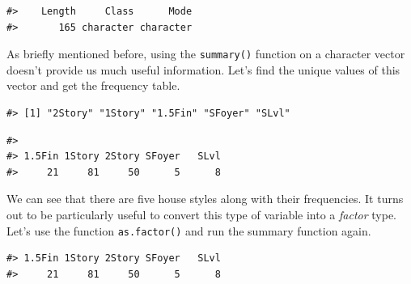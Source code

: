 \documentclass[
]{book}
\newenvironment{Shaded}{\begin{snugshade}}{\end{snugshade}}
\newcommand{\FunctionTok}[1]{\textcolor[rgb]{0.00,0.00,0.00}{#1}}
\newcommand{\NormalTok}[1]{#1}
\newcommand{\OtherTok}[1]{\textcolor[rgb]{0.56,0.35,0.01}{#1}}
\newcommand{\SpecialCharTok}[1]{\textcolor[rgb]{0.00,0.00,0.00}{#1}}
\begin{document}
\begin{verbatim}
#>    Length     Class      Mode 
#>       165 character character
\end{verbatim}

As briefly mentioned before, using the \texttt{summary()} function on a character vector doesn't provide us much useful information. Let's find the unique values of this vector and get the frequency table.

\begin{Shaded}
\end{Shaded}

\begin{verbatim}
#> [1] "2Story" "1Story" "1.5Fin" "SFoyer" "SLvl"
\end{verbatim}

\begin{Shaded}
\end{Shaded}

\begin{verbatim}
#> 
#> 1.5Fin 1Story 2Story SFoyer   SLvl 
#>     21     81     50      5      8
\end{verbatim}

We can see that there are five house styles along with their frequencies. It turns out to be particularly useful to convert this type of variable into a \emph{factor} type. Let's use the function \texttt{as.factor()} and run the summary function again.

\begin{Shaded}
\end{Shaded}

\begin{verbatim}
#> 1.5Fin 1Story 2Story SFoyer   SLvl 
#>     21     81     50      5      8
\end{verbatim}
\end{document}
